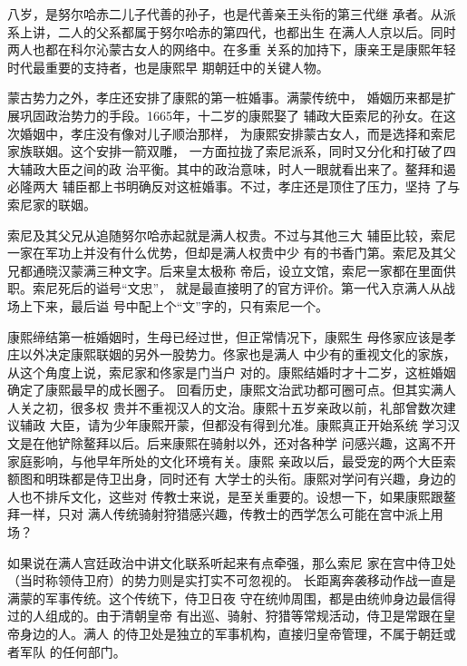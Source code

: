 八岁，是努尔哈赤二儿子代善的孙子，也是代善亲王头衔的第三代继%
承者。从派系上讲，二人的父系都属于努尔哈赤的第四代，也都出生%
在满人人京以后。同时两人也都在科尔沁蒙古女人的网络中。在多重%
关系的加持下，康亲王是康熙年轻时代最重要的支持者，也是康熙早%
期朝廷中的关键人物。%
\par
蒙古势力之外，孝庄还安排了康熙的第一桩婚事。满蒙传统中，%
婚姻历来都是扩展巩固政治势力的手段。1665年，十二岁的康熙娶了%
辅政大臣索尼的孙女。在这次婚姻中，孝庄没有像对儿子顺治那样，%
为康熙安排蒙古女人，而是选择和索尼家族联姻。这个安排一箭双雕，%
一方面拉拢了索尼派系，同时又分化和打破了四大辅政大臣之间的政%
治平衡。其中的政治意味，时人一眼就看出来了。鳌拜和遏必隆两大%
辅臣都上书明确反对这桩婚事。不过，孝庄还是顶住了压力，坚持%
了与索尼家的联姻。%
\par
索尼及其父兄从追随努尔哈赤起就是满人权贵。不过与其他三大%
辅臣比较，索尼一家在军功上并没有什么优势，但却是满人权贵中少%
有的书香门第。索尼及其父兄都通晓汉蒙满三种文字。后来皇太极称%
帝后，设立文馆，索尼一家都在里面供职。索尼死后的谥号“文忠”，%
就是最直接明了的官方评价。第一代入京满人从战场上下来，最后谥%
号中配上个“文”字的，只有索尼一个。%
\par
康熙缔结第一桩婚姻时，生母已经过世，但正常情况下，康熙生%
母佟家应该是孝庄以外决定康熙联姻的另外一股势力。佟家也是满人%
中少有的重视文化的家族，从这个角度上说，索尼家和佟家是门当户%
对的。康熙结婚时才十二岁，这桩婚姻确定了康熙最早的成长圈子。%
回看历史，康熙文治武功都可圈可点。但其实满人人关之初，很多权%
贵并不重视汉人的文治。康熙十五岁亲政以前，礼部曾数次建议辅政%
大臣，请为少年康熙开蒙，但都没有得到允准。康熙真正开始系统%
学习汉文是在他铲除鳌拜以后。后来康熙在骑射以外，还对各种学%
问感兴趣，这离不开家庭影响，与他早年所处的文化环境有关。康熙%
亲政以后，最受宠的两个大臣索额图和明珠都是侍卫出身，同时还有%
大学士的头衔。康熙对学问有兴趣，身边的人也不排斥文化，这些对%
传教士来说，是至关重要的。设想一下，如果康熙跟鳌拜一样，只对%
满人传统骑射狩猎感兴趣，传教士的西学怎么可能在宫中派上用场？%
\par
如果说在满人宫廷政治中讲文化联系听起来有点牵强，那么索尼%
家在宫中侍卫处（当时称领侍卫府）的势力则是实打实不可忽视的。%
长距离奔袭移动作战一直是满蒙的军事传统。这个传统下，侍卫日夜%
守在统帅周围，都是由统帅身边最信得过的人组成的。由于清朝皇帝%
有出巡、骑射、狩猎等常规活动，侍卫是常跟在皇帝身边的人。满人%
的侍卫处是独立的军事机构，直接归皇帝管理，不属于朝廷或者军队%
的任何部门。%
